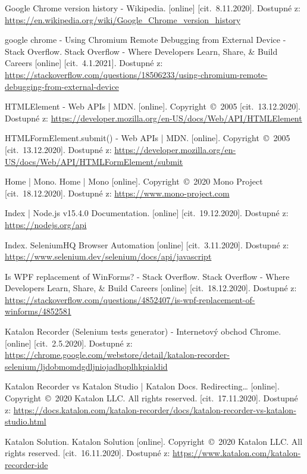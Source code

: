 \begin{thebibliography}{99}
 Google Chrome version history - Wikipedia. [online] [cit.~8.11.2020]. Dostupné z: \url{https://en.wikipedia.org/wiki/Google_Chrome_version_history}

 google chrome - Using Chromium Remote Debugging from External Device - Stack Overflow. Stack Overflow - Where Developers Learn, Share, \& Build Careers [online] [cit.~4.1.2021]. Dostupné z: \url{https://stackoverflow.com/questions/18506233/using-chromium-remote-debugging-from-external-device}

 HTMLElement - Web APIs | MDN. [online]. Copyright~©~2005 [cit.~13.12.2020]. Dostupné z: \url{https://developer.mozilla.org/en-US/docs/Web/API/HTMLElement}

 HTMLFormElement.submit() - Web APIs | MDN. [online]. Copyright~©~2005 [cit.~13.12.2020]. Dostupné z: \url{https://developer.mozilla.org/en-US/docs/Web/API/HTMLFormElement/submit}

 Home | Mono. Home | Mono [online]. Copyright~©~2020 Mono Project [cit.~18.12.2020]. Dostupné z: \url{https://www.mono-project.com}

 Index | Node.js v15.4.0 Documentation. [online] [cit.~19.12.2020]. Dostupné z: \url{https://nodejs.org/api}

 Index. SeleniumHQ Browser Automation [online] [cit.~3.11.2020]. Dostupné z: \url{https://www.selenium.dev/selenium/docs/api/javascript}

 Is WPF replacement of WinForms? - Stack Overflow. Stack Overflow - Where Developers Learn, Share, \& Build Careers [online] [cit.~18.12.2020]. Dostupné z: \url{https://stackoverflow.com/questions/4852407/is-wpf-replacement-of-winforms/4852581}

 Katalon Recorder (Selenium tests generator) - Internetový obchod Chrome. [online] [cit.~2.5.2020]. Dostupné z: \url{https://chrome.google.com/webstore/detail/katalon-recorder-selenium/ljdobmomdgdljniojadhoplhkpialdid}

 Katalon Recorder vs Katalon Studio | Katalon Docs. Redirecting… [online]. Copyright~©~2020 Katalon LLC. All rights reserved. [cit.~17.11.2020]. Dostupné z: \url{https://docs.katalon.com/katalon-recorder/docs/katalon-recorder-vs-katalon-studio.html}

 Katalon Solution. Katalon Solution [online]. Copyright~©~2020 Katalon LLC. All rights reserved. [cit.~16.11.2020]. Dostupné z: \url{https://www.katalon.com/katalon-recorder-ide}


\end{thebibliography}
